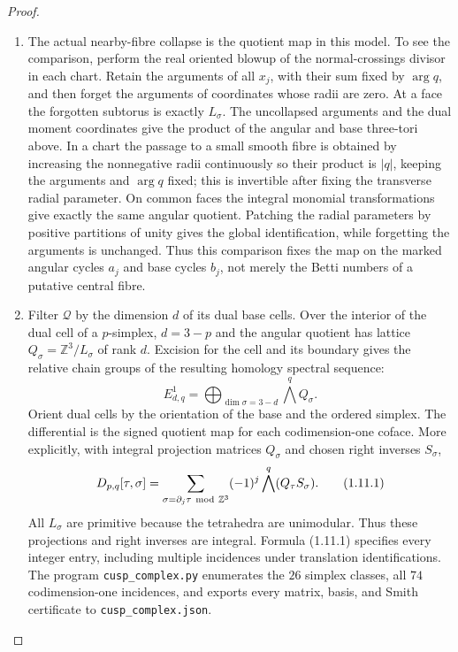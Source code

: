 \documentclass[11pt,a4paper]{article}
\theoremstyle{definition}
\begin{document}
\begin{proof}
\begin{enumerate}[label=\arabic*.]
\item The actual nearby-fibre collapse is the quotient map in this model.
To see the comparison, perform the real oriented blowup of the
normal-crossings divisor in each chart.  Retain the arguments of all
$x_j$, with their sum fixed by $\arg q$, and then forget the arguments
of coordinates whose radii are zero.  At a face the forgotten
subtorus is exactly $L_\sigma$.  The uncollapsed arguments and the
dual moment coordinates give the product of the angular and base
three-tori above.  In a chart the passage to a small smooth fibre is
obtained by increasing the nonnegative radii continuously so their
product is $|q|$, keeping the arguments and $\arg q$ fixed; this is
invertible after fixing the transverse radial parameter.  On common
faces the integral monomial transformations give exactly the same
angular quotient.  Patching the radial parameters by positive
partitions of unity gives the global identification, while forgetting
the arguments is unchanged.  Thus this comparison fixes the map on
the marked angular cycles $a_j$ and base cycles $b_j$, not merely
the Betti numbers of a putative central fibre.

\item Filter $\mathcal Q$ by the dimension $d$ of its dual base cells.
Over the interior of the dual cell of a $p$-simplex, $d=3-p$ and the
angular quotient has lattice
$Q_\sigma=\mathbb Z^3/L_\sigma$ of rank $d$.
Excision for the cell and its boundary gives the relative chain
groups of the resulting homology spectral sequence:
\[
E^1_{d,q}=\bigoplus_{\dim\sigma=3-d}\bigwedge^qQ_\sigma.
\]
Orient dual cells by the orientation of the base and the ordered
simplex.  The differential is the signed quotient map for each
codimension-one coface.  More explicitly, with integral projection
matrices $Q_\sigma$ and chosen right inverses $S_\sigma$,
\[
D_{p,q}[\tau,\sigma]=
 \sum_{\sigma=\partial_j\tau\ {\rm mod}\ \mathbb Z^3}
 (-1)^j\bigwedge^q(Q_\tau S_\sigma).
\tag{1.11.1}
\]
All $L_\sigma$ are primitive because the tetrahedra are unimodular.
Thus these projections and right inverses are integral.  Formula
(1.11.1) specifies every integer entry, including multiple incidences
under translation identifications.  The program
\texttt{cusp\_complex.py} enumerates the $26$ simplex classes, all
$74$ codimension-one incidences, and exports every matrix, basis, and
Smith certificate to \texttt{cusp\_complex.json}.


\end{enumerate}
\end{proof}
\end{document}
